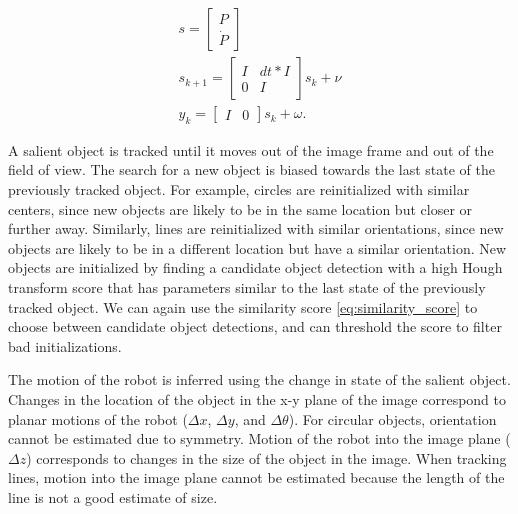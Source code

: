 \documentclass[letterpaper, 10 pt, conference]{ieeeconf}
\begin{document}
\begin{eqnarray*}
s = \begin{bmatrix} P \\ \dot{P} \end{bmatrix} \\
s_{k+1} = \begin{bmatrix} I & dt * I \\ 0 & I \end{bmatrix} s_{k} + \nu \\
y_k = \begin{bmatrix} I & 0 \end{bmatrix} s_k + \omega.
\end{eqnarray*}

A salient object is tracked until it moves out of the image frame and out of the field of view. The search for a new object is biased towards the last state of the previously tracked object. For example, circles are reinitialized with similar centers, since new objects are likely to be in the same location but closer or further away. Similarly, lines are reinitialized with similar orientations, since new objects are likely to be in a different location but have a similar orientation. New objects are initialized by finding a candidate object detection with a high Hough transform score that has parameters similar to the last state of the previously tracked object. We can again use the similarity score \eqref{eq:similarity_score} to choose between candidate object detections, and can threshold the score to filter bad initializations. 


The motion of the robot is inferred using the change in state of the salient object. Changes in the location of the object in the x-y plane of the image correspond to planar motions of the robot  ($\Delta x$, $\Delta y$, and $\Delta \theta$). For circular objects, orientation cannot be estimated due to symmetry. Motion of the robot into the image plane ($\Delta z$) corresponds to changes in the size of the object in the image. When tracking lines, motion into the image plane cannot be estimated because the length of the line is not a good estimate of size.
\end{document}
